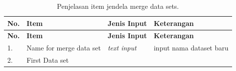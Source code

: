 \documentclass[12pt,]{krantz}
\begin{document}
\begin{longtable}[]{@{}llll@{}}
\caption{\label{tab:merge} Penjelasan item jendela merge data sets.}\tabularnewline
\toprule
\begin{minipage}[b]{0.04\columnwidth}\raggedright
\textbf{No.}\strut
\end{minipage} & \begin{minipage}[b]{0.14\columnwidth}\raggedright
\textbf{Item}\strut
\end{minipage} & \begin{minipage}[b]{0.09\columnwidth}\raggedright
\textbf{Jenis Input}\strut
\end{minipage} & \begin{minipage}[b]{0.61\columnwidth}\raggedright
\textbf{Keterangan}\strut
\end{minipage}\tabularnewline
\midrule
\endfirsthead
\toprule
\begin{minipage}[b]{0.04\columnwidth}\raggedright
\textbf{No.}\strut
\end{minipage} & \begin{minipage}[b]{0.14\columnwidth}\raggedright
\textbf{Item}\strut
\end{minipage} & \begin{minipage}[b]{0.09\columnwidth}\raggedright
\textbf{Jenis Input}\strut
\end{minipage} & \begin{minipage}[b]{0.61\columnwidth}\raggedright
\textbf{Keterangan}\strut
\end{minipage}\tabularnewline
\midrule
\endhead
\begin{minipage}[t]{0.04\columnwidth}\raggedright
1.\strut
\end{minipage} & \begin{minipage}[t]{0.14\columnwidth}\raggedright
Name for merge data set\strut
\end{minipage} & \begin{minipage}[t]{0.09\columnwidth}\raggedright
\emph{text input}\strut
\end{minipage} & \begin{minipage}[t]{0.61\columnwidth}\raggedright
input nama dataset baru\strut
\end{minipage}\tabularnewline
\begin{minipage}[t]{0.04\columnwidth}\raggedright
2.\strut
\end{minipage} & \begin{minipage}[t]{0.14\columnwidth}\raggedright
First Data set\strut
\end{minipage} & \begin{minipage}[t]{0.09\columnwidth}\raggedright

\end{minipage}
\end{longtable}
\end{document}
